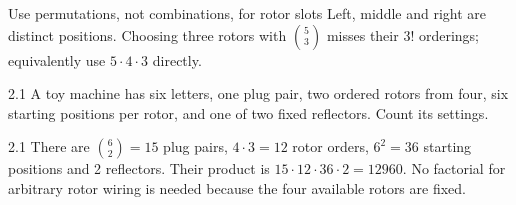 \documentclass[11pt,a4paper]{article}
\begin{document}
\begin{tip}{Use permutations, not combinations, for rotor slots}
Left, middle and right are distinct positions. Choosing three rotors with \(\binom53\) misses their \(3!\) orderings; equivalently use \(5\cdot4\cdot3\) directly.
\end{tip}
\begin{question}{2.1}
A toy machine has six letters, one plug pair, two ordered rotors from four, six starting positions per rotor, and one of two fixed reflectors. Count its settings.
\end{question}
\begin{answer}{2.1}
There are \(\binom62=15\) plug pairs, \(4\cdot3=12\) rotor orders, \(6^2=36\) starting positions and 2 reflectors. Their product is \(15\cdot12\cdot36\cdot2=12960\). No factorial for arbitrary rotor wiring is needed because the four available rotors are fixed.
\end{answer}
\end{document}
